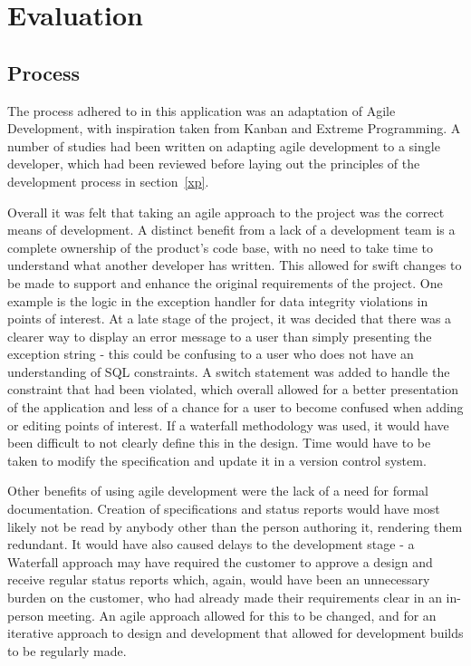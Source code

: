 \chapter{Evaluation}

\section{Process}

The process adhered to in this application was an adaptation of Agile Development, with inspiration taken from Kanban and Extreme Programming. A number of studies had been written on adapting agile development to a single developer, which had been reviewed before laying out the principles of the development process in section~\ref{xp}.

Overall it was felt that taking an agile approach to the project was the correct means of development. A distinct benefit from a lack of a development team is a complete ownership of the product's code base, with no need to take time to understand what another developer has written. This allowed for swift changes to be made to support and enhance the original requirements of the project. One example is the logic in the exception handler for data integrity violations in points of interest. At a late stage of the project, it was decided that there was a clearer way to display an error message to a user than simply presenting the exception string - this could be confusing to a user who does not have an understanding of SQL constraints. A switch statement was added to handle the constraint that had been violated, which overall allowed for a better presentation of the application and less of a chance for a user to become confused when adding or editing points of interest. If a waterfall methodology was used, it would have been difficult to not clearly define this in the design. Time would have to be taken to modify the specification and update it in a version control system.

Other benefits of using agile development were the lack of a need for formal documentation. Creation of specifications and status reports would have most likely not be read by anybody other than the person authoring it, rendering them redundant. It would have also caused delays to the development stage - a Waterfall approach may have required the customer to approve a design and receive regular status reports which, again, would have been an unnecessary burden on the customer, who had already made their requirements clear in an in-person meeting. An agile approach allowed for this to be changed, and for an iterative approach to design and development that allowed for development builds to be regularly made.

